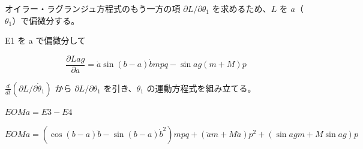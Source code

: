 \documentclass[dvipdfmx,a4paper,11pt]{jsarticle}
\begin{document}
オイラー・ラグランジュ方程式のもう一方の項 $\partial L/\partial\theta_1$ を求めるため、$L$ を $a$（$\theta_1$）で偏微分する。

E1 を a で偏微分して

\begin{equation}
  \frac{\partial Lag}{\partial a} = \dot{a} \sin \left(b-a\right) \dot{b} m p q-\sin a g \left(m+M\right) p
  \label{eq:E4}
\end{equation}

$\frac{d}{dt}(\partial L/\partial\dot\theta_1)$ から $\partial L/\partial\theta_1$ を引き、$\theta_1$ の運動方程式を組み立てる。

$EOMa = E3 - E4$

\begin{equation}
  EOMa = \left(\cos \left(b-a\right) \ddot{b}-\sin \left(b-a\right) \dot{b}^2\right) m p q+\left(\ddot{a} m+M \ddot{a}\right) p^2+\left(\sin a g m+M \sin a g\right) p
  \label{eq:E5}
\end{equation}
\end{document}
